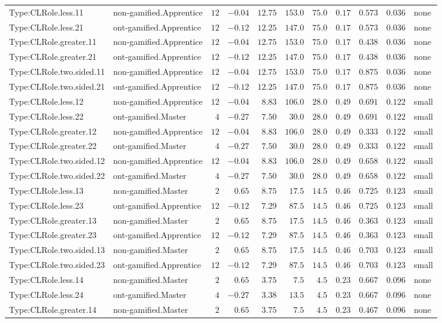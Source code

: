 \documentclass[6pt,a4paper]{article}
\begin{document}
{\begin{longtable}{llrrrrrrrrl}
Type:CLRole.less.11&non-gamified.Apprentice&$12$&$-0.04$&$12.75$&$153.0$&$ 75.0$&$ 0.17$&$0.573$&$0.036$&none\tabularnewline
Type:CLRole.less.21&ont-gamified.Apprentice&$12$&$-0.12$&$12.25$&$147.0$&$ 75.0$&$ 0.17$&$0.573$&$0.036$&none\tabularnewline
Type:CLRole.greater.11&non-gamified.Apprentice&$12$&$-0.04$&$12.75$&$153.0$&$ 75.0$&$ 0.17$&$0.438$&$0.036$&none\tabularnewline
Type:CLRole.greater.21&ont-gamified.Apprentice&$12$&$-0.12$&$12.25$&$147.0$&$ 75.0$&$ 0.17$&$0.438$&$0.036$&none\tabularnewline
Type:CLRole.two.sided.11&non-gamified.Apprentice&$12$&$-0.04$&$12.75$&$153.0$&$ 75.0$&$ 0.17$&$0.875$&$0.036$&none\tabularnewline
Type:CLRole.two.sided.21&ont-gamified.Apprentice&$12$&$-0.12$&$12.25$&$147.0$&$ 75.0$&$ 0.17$&$0.875$&$0.036$&none\tabularnewline
Type:CLRole.less.12&non-gamified.Apprentice&$12$&$-0.04$&$ 8.83$&$106.0$&$ 28.0$&$ 0.49$&$0.691$&$0.122$&small\tabularnewline
Type:CLRole.less.22&ont-gamified.Master&$ 4$&$-0.27$&$ 7.50$&$ 30.0$&$ 28.0$&$ 0.49$&$0.691$&$0.122$&small\tabularnewline
Type:CLRole.greater.12&non-gamified.Apprentice&$12$&$-0.04$&$ 8.83$&$106.0$&$ 28.0$&$ 0.49$&$0.333$&$0.122$&small\tabularnewline
Type:CLRole.greater.22&ont-gamified.Master&$ 4$&$-0.27$&$ 7.50$&$ 30.0$&$ 28.0$&$ 0.49$&$0.333$&$0.122$&small\tabularnewline
Type:CLRole.two.sided.12&non-gamified.Apprentice&$12$&$-0.04$&$ 8.83$&$106.0$&$ 28.0$&$ 0.49$&$0.658$&$0.122$&small\tabularnewline
Type:CLRole.two.sided.22&ont-gamified.Master&$ 4$&$-0.27$&$ 7.50$&$ 30.0$&$ 28.0$&$ 0.49$&$0.658$&$0.122$&small\tabularnewline
Type:CLRole.less.13&non-gamified.Master&$ 2$&$ 0.65$&$ 8.75$&$ 17.5$&$ 14.5$&$ 0.46$&$0.725$&$0.123$&small\tabularnewline
Type:CLRole.less.23&ont-gamified.Apprentice&$12$&$-0.12$&$ 7.29$&$ 87.5$&$ 14.5$&$ 0.46$&$0.725$&$0.123$&small\tabularnewline
Type:CLRole.greater.13&non-gamified.Master&$ 2$&$ 0.65$&$ 8.75$&$ 17.5$&$ 14.5$&$ 0.46$&$0.363$&$0.123$&small\tabularnewline
Type:CLRole.greater.23&ont-gamified.Apprentice&$12$&$-0.12$&$ 7.29$&$ 87.5$&$ 14.5$&$ 0.46$&$0.363$&$0.123$&small\tabularnewline
Type:CLRole.two.sided.13&non-gamified.Master&$ 2$&$ 0.65$&$ 8.75$&$ 17.5$&$ 14.5$&$ 0.46$&$0.703$&$0.123$&small\tabularnewline
Type:CLRole.two.sided.23&ont-gamified.Apprentice&$12$&$-0.12$&$ 7.29$&$ 87.5$&$ 14.5$&$ 0.46$&$0.703$&$0.123$&small\tabularnewline
Type:CLRole.less.14&non-gamified.Master&$ 2$&$ 0.65$&$ 3.75$&$  7.5$&$  4.5$&$ 0.23$&$0.667$&$0.096$&none\tabularnewline
Type:CLRole.less.24&ont-gamified.Master&$ 4$&$-0.27$&$ 3.38$&$ 13.5$&$  4.5$&$ 0.23$&$0.667$&$0.096$&none\tabularnewline
Type:CLRole.greater.14&non-gamified.Master&$ 2$&$ 0.65$&$ 3.75$&$  7.5$&$  4.5$&$ 0.23$&$0.467$&$0.096$&none\tabularnewline

\end{longtable}}
\end{document}
